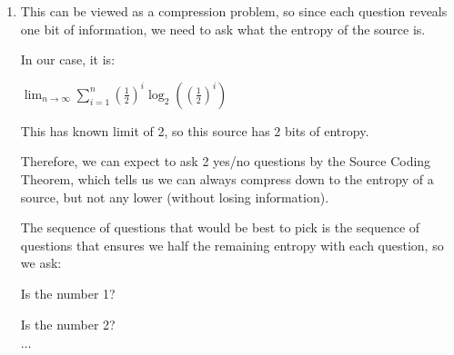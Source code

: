 


\begin{enumerate}[label=(\alph*)]

  \item

    This can be viewed as a compression problem, so since each question reveals one bit of information, we need to ask what the entropy of the source is.

    In our case, it is:

    $\lim_{n \to \infty} \sum_{i=1}^n (\frac{1}{2})^i \log_2 ((\frac{1}{2})^i)$

    This has known limit of 2, so this source has 2 bits of entropy.

    Therefore, we can expect to ask 2 yes/no questions by the Source Coding Theorem, which tells us we can always compress down to the entropy of a source, but not any lower (without losing information).

    The sequence of questions that would be best to pick is the sequence of questions that ensures we half the remaining entropy with each question, so we ask:

    Is the number 1?

    Is the number 2?

    $\ldots$
        
    \end{enumerate}

